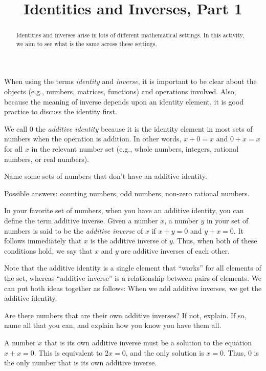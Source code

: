 \documentclass{ximera}
\title{Identities and Inverses, Part 1}
\begin{document}
\begin{abstract}
Identities and inverses arise in lots of different mathematical settings.  In this activity, we aim to see what is the same across these settings.  
\end{abstract}
\maketitle


%
%
When using the terms \emph{identity} and \emph{inverse}, it is important to be clear about the objects (e.g., numbers, matrices, functions) and operations involved.  Also, because the meaning of inverse depends upon an identity element, it is good practice to discuss the identity first.  

We call $0$ the \emph{additive identity} because it is the identity element in most sets of numbers when the operation is addition.  In other words, $x+0=x$ and $0+x=x$ for all $x$ in the relevant number set (e.g., whole numbers, integers, rational numbers, or real numbers). 
\begin{question}
Name some sets of numbers that don't have an additive identity.  
\begin{freeResponse}
Possible answers:  counting numbers, odd numbers, non-zero rational numbers.  
\end{freeResponse}
\end{question}

In your favorite set of numbers, when you have an additive identity, you can define the term additive inverse.  Given a number $x$, a number $y$ in your set of numbers is said to be the \emph{additive inverse} of $x$ if $x+y=0$ and $y+x=0$.  It follows immediately that $x$ is the additive inverse of $y$.  Thus, when both of these conditions hold, we say that $x$ and $y$ are additive inverses of each other.  

Note that the additive identity is a single element that ``works'' for all elements of the set, whereas ``additive inverse'' is a relationship between pairs of elements.  We can put both ideas together as follows:  When we add additive inverses, we get the additive identity.
\begin{question}
Are there numbers that are their own additive inverses?  If not, explain.  If so, name all that you can, and explain how you know you have them all.  
\begin{freeResponse}
A number $x$ that is its own additive inverse must be a solution to the equation $x+x = 0$.  This is equivalent to $2x=0$, and the only solution is $x=0$.  Thus, 0 is the only number that is its own additive inverse.   
\end{freeResponse}
\end{question}
\end{document}
